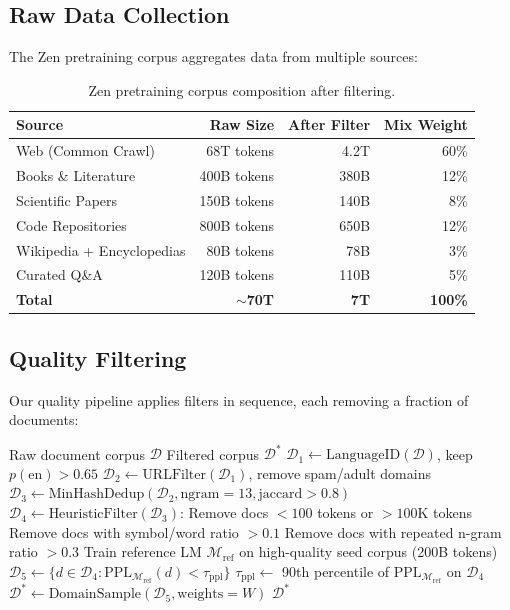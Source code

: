 \documentclass[11pt,a4paper]{article}
\begin{document}
\subsection{Raw Data Collection}

The Zen pretraining corpus aggregates data from multiple sources:

\begin{table}[H]
\centering
\begin{tabular}{lrrr}
\toprule
\textbf{Source} & \textbf{Raw Size} & \textbf{After Filter} & \textbf{Mix Weight} \\
\midrule
Web (Common Crawl) & 68T tokens & 4.2T & 60\% \\
Books \& Literature & 400B tokens & 380B & 12\% \\
Scientific Papers & 150B tokens & 140B & 8\% \\
Code Repositories & 800B tokens & 650B & 12\% \\
Wikipedia + Encyclopedias & 80B tokens & 78B & 3\% \\
Curated Q\&A & 120B tokens & 110B & 5\% \\
\midrule
\textbf{Total} & \textbf{$\sim$70T} & \textbf{7T} & \textbf{100\%} \\
\bottomrule
\end{tabular}
\caption{Zen pretraining corpus composition after filtering.}
\end{table}

\subsection{Quality Filtering}

Our quality pipeline applies filters in sequence, each removing a fraction of documents:

\begin{algorithm}[H]
\caption{Zen Quality Filtering Pipeline}
\begin{algorithmic}[1]
\REQUIRE Raw document corpus $\mathcal{D}$
\ENSURE Filtered corpus $\mathcal{D}^*$
\STATE $\mathcal{D}_1 \leftarrow \text{LanguageID}(\mathcal{D})$, keep $p(\text{en}) > 0.65$
\STATE $\mathcal{D}_2 \leftarrow \text{URLFilter}(\mathcal{D}_1)$, remove spam/adult domains
\STATE $\mathcal{D}_3 \leftarrow \text{MinHashDedup}(\mathcal{D}_2, \text{ngram}=13, \text{jaccard}>0.8)$
\STATE $\mathcal{D}_4 \leftarrow \text{HeuristicFilter}(\mathcal{D}_3)$:
\STATE \quad Remove docs $< 100$ tokens or $> 100$K tokens
\STATE \quad Remove docs with symbol/word ratio $> 0.1$
\STATE \quad Remove docs with repeated n-gram ratio $> 0.3$
\STATE Train reference LM $\mathcal{M}_\text{ref}$ on high-quality seed corpus (200B tokens)
\STATE $\mathcal{D}_5 \leftarrow \{d \in \mathcal{D}_4 : \text{PPL}_{\mathcal{M}_\text{ref}}(d) < \tau_\text{ppl}\}$
\STATE $\tau_\text{ppl} \leftarrow$ 90th percentile of $\text{PPL}_{\mathcal{M}_\text{ref}}$ on $\mathcal{D}_4$
\STATE $\mathcal{D}^* \leftarrow \text{DomainSample}(\mathcal{D}_5, \text{weights}=W)$
\RETURN $\mathcal{D}^*$
\end{algorithmic}
\end{algorithm}
\end{document}
